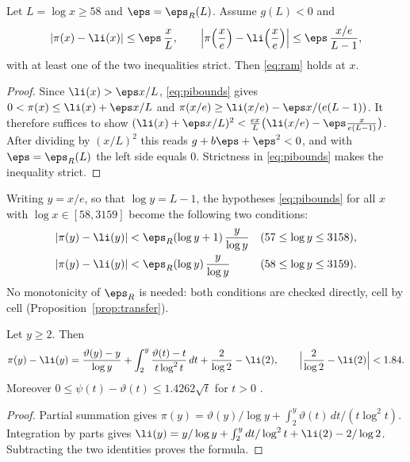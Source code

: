 \begin{lemma}\label{lem:reduce}
Let $L = \log x \ge 58$ and $\eps = \eps_R(L)$.
Assume $g(L) < 0$ and
\begin{equation}\label{eq:pibounds}
|\pi(x) - \li(x)| \le \eps\, \frac{x}{L}, \qquad \Big|\pi\Big(\frac xe\Big) - \li\Big(\frac xe\Big)\Big| \le \eps\, \frac{x/e}{L-1},
\end{equation}
with at least one of the two inequalities strict.
Then \eqref{eq:ram} holds at $x$.
\end{lemma}

\begin{proof}
Since $\li(x) > \eps x/L$, \eqref{eq:pibounds} gives $0 < \pi(x) \le \li(x) + \eps x/L$ and $\pi(x/e) \ge \li(x/e) - \eps x/(e(L-1))$.
It therefore suffices to show
$(\li(x) + \eps x/L)^2 < \frac{ex}{L}\big(\li(x/e) - \eps\frac{x}{e(L-1)}\big)$.
After dividing by $(x/L)^2$ this reads $g + b\eps + \eps^2 < 0$, and with $\eps = \eps_R(L)$ the left side equals $0$.
Strictness in \eqref{eq:pibounds} makes the inequality strict.
\end{proof}

Writing $y = x/e$, so that $\log y = L - 1$, the hypotheses \eqref{eq:pibounds} for all $x$ with $\log x \in [58, 3159]$ become the following two conditions:
\begin{equation}\label{eq:target}
\begin{aligned}
|\pi(y) - \li(y)| &< \eps_R(\log y + 1)\,\frac{y}{\log y} &&(57 \le \log y \le 3158),\\
|\pi(y) - \li(y)| &< \eps_R(\log y)\,\frac{y}{\log y} &&(58 \le \log y \le 3159).
\end{aligned}
\end{equation}
No monotonicity of $\eps_R$ is needed: both conditions are checked directly, cell by cell (Proposition~\ref{prop:transfer}).

\begin{lemma}[transfer]\label{lem:transfer}
Let $y \ge 2$.
Then
\[
\pi(y) - \li(y) = \frac{\vartheta(y) - y}{\log y} + \int_2^y \frac{\vartheta(t) - t}{t\log^2 t}\,dt + \frac{2}{\log 2} - \li(2),
\qquad \Big|\frac{2}{\log 2} - \li(2)\Big| < 1.84.
\]
Moreover $0 \le \psi(t) - \vartheta(t) \le 1.4262\sqrt t$ for $t > 0$ \cite[Thm.~13]{RS62}.
\end{lemma}

\begin{proof}
Partial summation gives $\pi(y) = \vartheta(y)/\log y + \int_2^y \vartheta(t)\,dt/(t\log^2 t)$.
Integration by parts gives $\li(y) = y/\log y + \int_2^y dt/\log^2 t + \li(2) - 2/\log 2$.
Subtracting the two identities proves the formula.
\end{proof}

